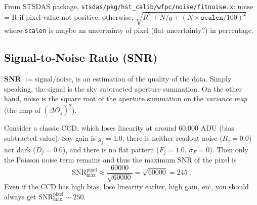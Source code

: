 From STSDAS package, \texttt{stsdas/pkg/hst\_calib/wfpc/noise/fitnoise.x}: noise = R if pixel value not positive, otherwise, $ \sqrt{R^2 + N/g + (N \times \texttt{scalen}/100)^2} $ where \texttt{scalen} is maybe an uncertainty of pixel (flat uncertainty?) in percentage.

%
%
%
%
%


\subsection{Signal-to-Noise Ratio (SNR)}
\textbf{SNR} $ := \mathrm{signal}/\mathrm{noise} $, is an estimation of the quality of the data. Simply speaking, the signal is the sky subtracted aperture summation. On the other hand, noise is the square root of the aperture summation on the \textit{variance map} (the map of $ (\Delta O_j)^2 $).

\begin{ex}
Consider a classic CCD, which loses linearity at around 60,000 ADU (bias subtracted value). Say gain is $ g_j = 1.0 $, there is neither readout noise ($ R_j = 0.0 $) nor dark ($ D_j = 0.0 $), and there is no flat pattern ($ F_j = 1.0 $, $ \sigma_F = 0 $). Then only the Poisson noise term remains and thus the maximum SNR of the pixel is 
\begin{equation}
  \mathrm{SNR}_\mathrm{max}^\mathrm{pixel} 
    \approx \frac{60000}{\sqrt{60000}} = \sqrt{60000} = 245 ~.
\end{equation}
Even if the CCD has high bias, lose linearity earlier, high gain, etc, you should always get $ \mathrm{SNR}_\mathrm{max}^\mathrm{pixel} \sim 250 $.
\end{ex}

